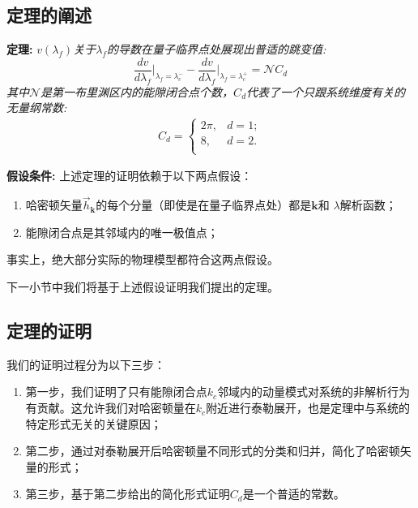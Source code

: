		\subsection{定理的阐述}
			
			{\bf 定理:}
			\textit{$v(\lambda_f)$关于$\lambda_f$的导数在量子临界点处展现出普适的跳变值:
				\begin{equation}\label{eq:Cd}
					\frac{dv}{d\lambda_f}\bigg |_{\lambda_f=\lambda_c^-} - \frac{dv}{d\lambda_f}\bigg |_{\lambda_f=\lambda_c^+} = \mathcal{N} C_d
				\end{equation}
				其中$\mathcal{N}$是第一布里渊区内的能隙闭合点个数，$C_d$代表了一个只跟系统维度有关的无量纲常数:
				\begin{eqnarray}\label{eq:cd}
					C_d = \left\{\begin{array}{cl}
						2\pi, & d=1;   \\
						8, & d=2. \\
					\end{array}\right.
				\end{eqnarray}
			}
		
			{\bf 假设条件:}
			上述定理的证明依赖于以下两点假设：
			\begin{enumerate}
				\item 哈密顿矢量${\vec{h}}_{\mathbf{k}}$的每个分量（即使是在量子临界点处）都是$\mathbf{k}$和 $\lambda$解析函数；
				\item 能隙闭合点是其邻域内的唯一极值点；
			\end{enumerate}
			事实上，绝大部分实际的物理模型都符合这两点假设。
			
			下一小节中我们将基于上述假设证明我们提出的定理。
			
		\subsection{定理的证明}
		
			我们的证明过程分为以下三步：
			\begin{enumerate}
				\item 第一步，我们证明了只有能隙闭合点$k_c$邻域内的动量模式对系统的非解析行为有贡献。这允许我们对哈密顿量在$k_c$附近进行泰勒展开，也是定理中与系统的特定形式无关的关键原因；
				\item 第二步，通过对泰勒展开后哈密顿量不同形式的分类和归并，简化了哈密顿矢量的形式；
				\item 第三步，基于第二步给出的简化形式证明$C_d$是一个普适的常数。
			\end{enumerate}
		
